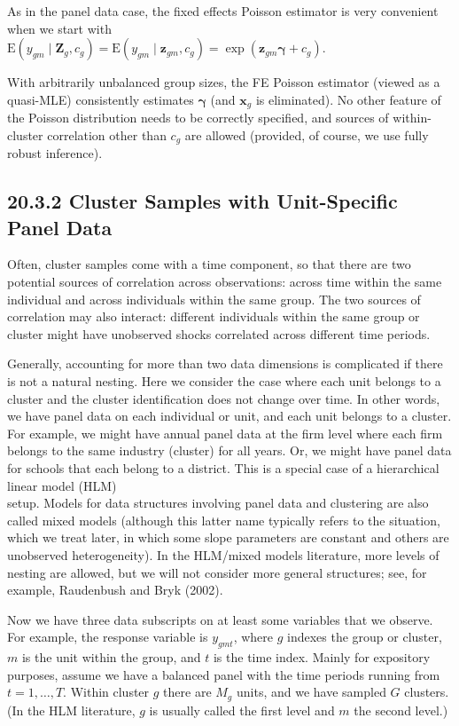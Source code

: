 \documentclass[10pt]{article}
\begin{document}
As in the panel data case, the fixed effects Poisson estimator is very convenient when we start with\\
$\mathrm{E}\left(y_{g m} \mid \mathbf{Z}_{g}, c_{g}\right)=\mathrm{E}\left(y_{g m} \mid \mathbf{z}_{g m}, c_{g}\right)=\exp \left(\mathbf{z}_{g m} \boldsymbol{\gamma}+c_{g}\right)$.

With arbitrarily unbalanced group sizes, the FE Poisson estimator (viewed as a quasi-MLE) consistently estimates $\boldsymbol{\gamma}$ (and $\mathbf{x}_{g}$ is eliminated). No other feature of the Poisson distribution needs to be correctly specified, and sources of within-cluster correlation other than $c_{g}$ are allowed (provided, of course, we use fully robust inference).

\subsection*{20.3.2 Cluster Samples with Unit-Specific Panel Data}
Often, cluster samples come with a time component, so that there are two potential sources of correlation across observations: across time within the same individual and across individuals within the same group. The two sources of correlation may also interact: different individuals within the same group or cluster might have unobserved shocks correlated across different time periods.

Generally, accounting for more than two data dimensions is complicated if there is not a natural nesting. Here we consider the case where each unit belongs to a cluster and the cluster identification does not change over time. In other words, we have panel data on each individual or unit, and each unit belongs to a cluster. For example, we might have annual panel data at the firm level where each firm belongs to the same industry (cluster) for all years. Or, we might have panel data for schools that each belong to a district. This is a special case of a hierarchical linear model (HLM)\\
setup. Models for data structures involving panel data and clustering are also called mixed models (although this latter name typically refers to the situation, which we treat later, in which some slope parameters are constant and others are unobserved heterogeneity). In the HLM/mixed models literature, more levels of nesting are allowed, but we will not consider more general structures; see, for example, Raudenbush and Bryk (2002).

Now we have three data subscripts on at least some variables that we observe. For example, the response variable is $y_{g m t}$, where $g$ indexes the group or cluster, $m$ is the unit within the group, and $t$ is the time index. Mainly for expository purposes, assume we have a balanced panel with the time periods running from $t=1, \ldots, T$. Within cluster $g$ there are $M_{g}$ units, and we have sampled $G$ clusters. (In the HLM literature, $g$ is usually called the first level and $m$ the second level.)
\end{document}
